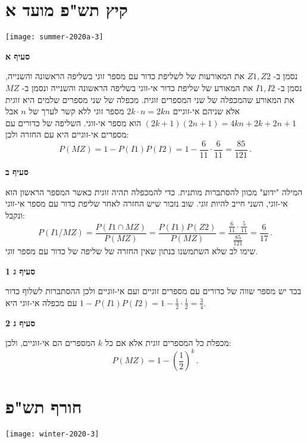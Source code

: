 
\section{קיץ תש"פ מועד א}

\begin{center}
\texttt{[image: summer-2020a-3]}
\end{center}

\textbf{סעיף א}

נסמן ב-%
$Z1,Z2$
את המאורעות של לשליפת כדור עם מספר זוגי בשליפה הראשונה והשנייה, נסמן ב-%
$I1,I2$
את המאורע של שליפת כדור אי-זוגי בשליפה הראשונה והשנייה ונסמן ב-%
$MZ$
את המאורע שהמכפלה של שני המספרים זוגית. מכפלה של שני מספרים שלמים היא זוגית אלא שניהם אי-זוגיים
$2k\cdot n = 2kn$
מספר זוגי ללא קשר לערך של 
$n$
אבל
$(2k+1)(2n+1)= 4kn + 2k + 2n +1$
הוא מספר אי-זוגי. השליפה של כדורים עם מספרים אי-זוגיים היא עם החזרה ולכן:
\[
P(MZ)=1-P(I1)P(I2)=1-\frac{6}{11}\cdot \frac{6}{11}=\frac{85}{121}\,.
\]

\textbf{סעיף ב}

המילה "ידוע" מכוון להסתברות מותנית. כדי להמכפלה תהיה זוגית כאשר המספר הראשון הוא אי-זוגי, השני חייב להיות זוגי. שוב נזכור שיש החזרה לאחר שליפת כדור עם מספר אי-זוגי ונקבל:
\[
P(I1/MZ) = \frac{P(I1\cap MZ)}{P(MZ)}= \frac{P(I1)P(Z2)}{P(MZ)}=
\frac{\frac{6}{11}\cdot\frac{5}{11}}{\frac{85}{121}}=\frac{6}{17}\,.
\]
שימו לב שלא השתמשנו בנתון שאין החזרה של שליפה של כדור עם מספר זוגי.

\textbf{סעיף ג 1}

בכד יש מספר שווה של כדורים עם מספרים זוגיים ועם אי-זוגיים ולכן ההסתברות לשלוף כדור עם מכפלה אי-זוגי היא 
$1-P(I1)P(I2)=1-\frac{1}{2}\cdot\frac{1}{2}=\frac{3}{4}$.

\textbf{סעיף ג 2}

מכפלת כל המספרים זוגית אלא אם כל 
$k$
המספרים הם אי-זוגיים, ולכן:
\[
P(MZ)=1-\left(\frac{1}{2}\right)^k\,.
\]


\section{חורף תש"פ}

\begin{center}
\texttt{[image: winter-2020-3]}
\end{center}

